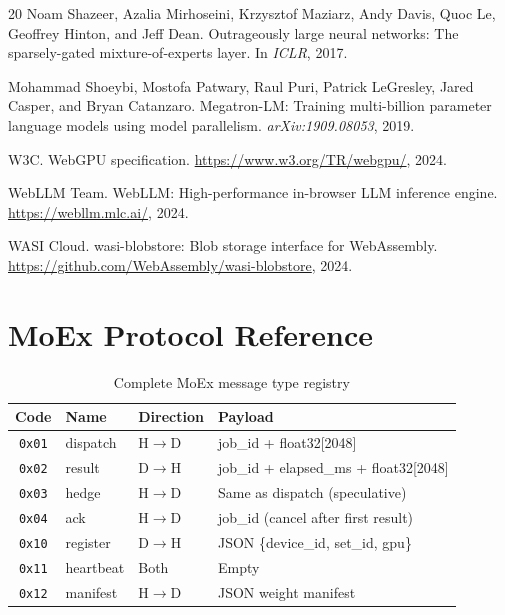 \documentclass[11pt,a4paper]{article}
\begin{document}
\begin{thebibliography}{20}
Noam Shazeer, Azalia Mirhoseini, Krzysztof Maziarz, Andy Davis,
Quoc Le, Geoffrey Hinton, and Jeff Dean.
\newblock Outrageously large neural networks: The sparsely-gated
  mixture-of-experts layer.
\newblock In \emph{ICLR}, 2017.

Mohammad Shoeybi, Mostofa Patwary, Raul Puri, Patrick LeGresley, Jared
Casper, and Bryan Catanzaro.
\newblock Megatron-LM: Training multi-billion parameter language models
  using model parallelism.
\newblock \emph{arXiv:1909.08053}, 2019.

{W3C}.
\newblock WebGPU specification.
\newblock \url{https://www.w3.org/TR/webgpu/}, 2024.

{WebLLM Team}.
\newblock WebLLM: High-performance in-browser LLM inference engine.
\newblock \url{https://webllm.mlc.ai/}, 2024.

{WASI Cloud}.
\newblock wasi-blobstore: Blob storage interface for WebAssembly.
\newblock \url{https://github.com/WebAssembly/wasi-blobstore}, 2024.

\end{thebibliography}

\appendix
\section{MoEx Protocol Reference}
\label{app:protocol}

\begin{table}[h]
\centering
\caption{Complete MoEx message type registry}
\begin{tabular}{@{}cllp{6cm}@{}}
\toprule
Code & Name & Direction & Payload \\
\midrule
\texttt{0x01} & dispatch & H$\to$D & job\_id + float32[2048] \\
\texttt{0x02} & result & D$\to$H & job\_id + elapsed\_ms + float32[2048] \\
\texttt{0x03} & hedge & H$\to$D & Same as dispatch (speculative) \\
\texttt{0x04} & ack & H$\to$D & job\_id (cancel after first result) \\
\texttt{0x10} & register & D$\to$H & JSON \{device\_id, set\_id, gpu\} \\
\texttt{0x11} & heartbeat & Both & Empty \\
\texttt{0x12} & manifest & H$\to$D & JSON weight manifest \\
\bottomrule
\end{tabular}
\end{table}
\end{document}
